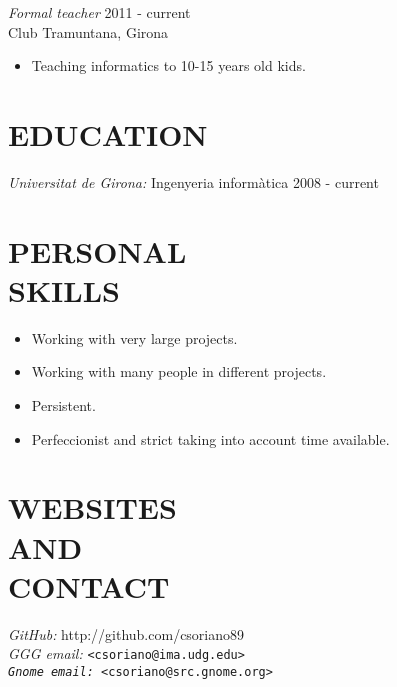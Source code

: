 \documentclass[margin]{res}
\begin{document}
\begin{resume}
                {\sl Formal teacher} \hfill 2011 - current \\
                Club Tramuntana, Girona
                \begin{itemize}  \itemsep -2pt
                \item Teaching informatics to 10-15 years old kids. 
                \end{itemize}
                
\section{\small EDUCATION}
                {\sl Universitat de Girona:} Ingenyeria informàtica \hfill 2008 - current \\

\section{\small PERSONAL \\ SKILLS}
                \begin{itemize}  \itemsep -2pt
                \item Working with very large projects.
                \item Working with many people in different projects.
                \item Persistent.
                \item Perfeccionist and strict taking into account time available.
                \end{itemize}
                
\section{\small WEBSITES \\ AND \\ CONTACT}
                {\sl GitHub:} http://github.com/csoriano89 \\
                {\sl GGG email:} \tt <csoriano@ima.udg.edu> \\
                {\sl Gnome email:} \tt <csoriano@src.gnome.org> \\

\end{resume}
\end{document}
